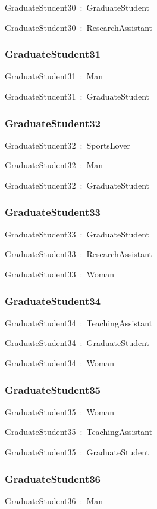 \documentclass{article}
\begin{document}
GraduateStudent30~:~GraduateStudent

GraduateStudent30~:~ResearchAssistant

\subsubsection*{GraduateStudent31}

GraduateStudent31~:~Man

GraduateStudent31~:~GraduateStudent

\subsubsection*{GraduateStudent32}

GraduateStudent32~:~SportsLover

GraduateStudent32~:~Man

GraduateStudent32~:~GraduateStudent

\subsubsection*{GraduateStudent33}

GraduateStudent33~:~GraduateStudent

GraduateStudent33~:~ResearchAssistant

GraduateStudent33~:~Woman

\subsubsection*{GraduateStudent34}

GraduateStudent34~:~TeachingAssistant

GraduateStudent34~:~GraduateStudent

GraduateStudent34~:~Woman

\subsubsection*{GraduateStudent35}

GraduateStudent35~:~Woman

GraduateStudent35~:~TeachingAssistant

GraduateStudent35~:~GraduateStudent

\subsubsection*{GraduateStudent36}

GraduateStudent36~:~Man
\end{document}

